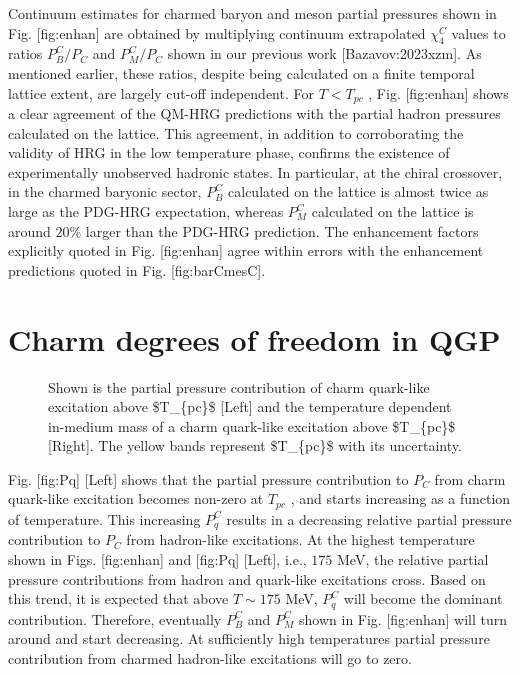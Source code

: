 \documentclass[11pt,a4paper]{article}
\begin{document}
Continuum estimates for charmed baryon and meson partial pressures shown in Fig. [fig:enhan] are obtained by multiplying continuum extrapolated  $\chi^C_4$  values to ratios  $P^C_B/P_C$  and  $P^C_M/P_C$   shown in our previous work [Bazavov:2023xzm]. As mentioned earlier, these ratios, despite being calculated on a finite temporal lattice extent, are largely cut-off independent. For  $T<T_{pc}$ , Fig. [fig:enhan] shows a clear agreement of the QM-HRG predictions with the  partial hadron pressures calculated on the lattice. This agreement, in addition to corroborating  the validity of HRG in the low temperature phase, confirms the existence of experimentally unobserved hadronic states. In particular, at the chiral crossover, in the charmed baryonic sector,  $P^C_B$  calculated on the lattice is almost twice as large as the PDG-HRG expectation, whereas  $P^C_M$  calculated on the lattice is around  $20\%$  larger than the  PDG-HRG prediction. The enhancement factors explicitly quoted in Fig. [fig:enhan] agree within errors with the enhancement predictions quoted in Fig. [fig:barCmesC].

\section{Charm degrees of freedom in QGP}

\begin{figure}[h]
\caption{Shown is the partial pressure contribution of charm quark-like excitation above  \$T\_\{pc\}\$  [Left] and the temperature dependent in-medium mass of a charm quark-like excitation above  \$T\_\{pc\}\$  [Right]. The yellow bands represent  \$T\_\{pc\}\$  with its uncertainty.}
\end{figure}

\begin{figure}[h]
\end{figure}

Fig. [fig:Pq] [Left] shows that the partial pressure contribution to  $P_C$  from charm quark-like excitation becomes non-zero at  $T_{pc}$ , and starts increasing as a function of temperature. This increasing  $P^C_q$  results in a decreasing relative partial pressure contribution to  $P_C$  from hadron-like excitations. At the highest temperature shown in Figs. [fig:enhan] and [fig:Pq] [Left], i.e.,  $175$  MeV, the relative partial pressure contributions from hadron and quark-like excitations cross. Based on this trend, it is expected that above  $T\sim175$  MeV,  $P^C_q$  will become the dominant contribution. Therefore, eventually  $P^C_B$  and  $P^C_M$  shown in Fig. [fig:enhan] will turn around and start decreasing. At sufficiently high  temperatures partial pressure contribution from charmed hadron-like excitations will go to zero.
\end{document}
